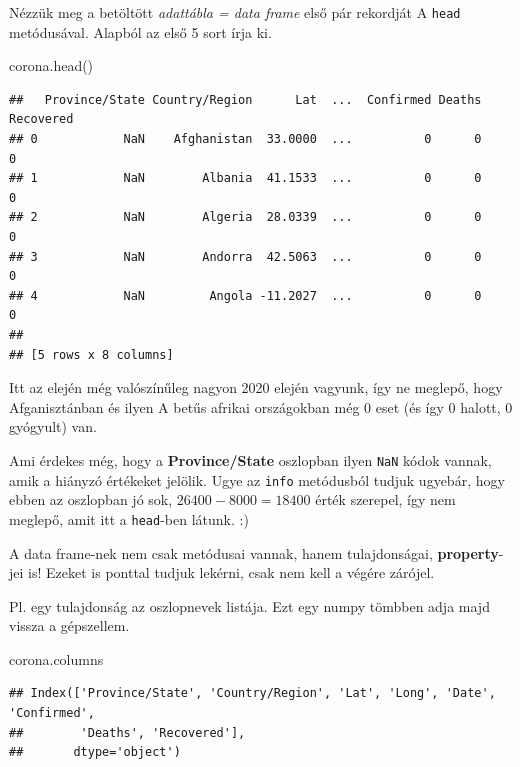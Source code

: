 \documentclass[
]{book}
\newenvironment{Shaded}{\begin{snugshade}}{\end{snugshade}}
\newcommand{\NormalTok}[1]{#1}
\begin{document}
Nézzük meg a betöltött \emph{adattábla = data frame} első pár rekordját A \texttt{head} metódusával. Alapból az első 5 sort írja ki.

\begin{Shaded}
\begin{Highlighting}[]
\NormalTok{corona.head()}
\end{Highlighting}
\end{Shaded}

\begin{verbatim}
##   Province/State Country/Region      Lat  ...  Confirmed Deaths  Recovered
## 0            NaN    Afghanistan  33.0000  ...          0      0          0
## 1            NaN        Albania  41.1533  ...          0      0          0
## 2            NaN        Algeria  28.0339  ...          0      0          0
## 3            NaN        Andorra  42.5063  ...          0      0          0
## 4            NaN         Angola -11.2027  ...          0      0          0
## 
## [5 rows x 8 columns]
\end{verbatim}

Itt az elején még valószínűleg nagyon 2020 elején vagyunk, így ne meglepő, hogy Afganisztánban és ilyen A betűs afrikai országokban még 0 eset (és így 0 halott, 0 gyógyult) van.

Ami érdekes még, hogy a \textbf{Province/State} oszlopban ilyen \texttt{NaN} kódok vannak, amik a hiányzó értékeket jelölik. Ugye az \texttt{info} metódusból tudjuk ugyebár, hogy ebben az oszlopban jó sok, \(26400-8000=18400\) érték szerepel, így nem meglepő, amit itt a \texttt{head}-ben látunk. :)

A data frame-nek nem csak metódusai vannak, hanem tulajdonságai, \textbf{property}-jei is! Ezeket is ponttal tudjuk lekérni, csak nem kell a végére zárójel.

Pl. egy tulajdonság az oszlopnevek listája. Ezt egy numpy tömbben adja majd vissza a gépszellem.

\begin{Shaded}
\begin{Highlighting}[]
\NormalTok{corona.columns}
\end{Highlighting}
\end{Shaded}

\begin{verbatim}
## Index(['Province/State', 'Country/Region', 'Lat', 'Long', 'Date', 'Confirmed',
##        'Deaths', 'Recovered'],
##       dtype='object')
\end{verbatim}
\end{document}
